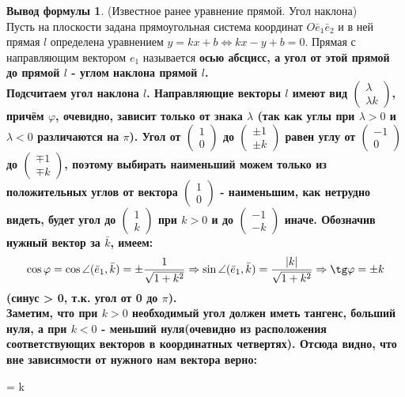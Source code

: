 \documentclass[a4paper, 12pt]{article}
\renewcommand{\phi}{\varphi}
\theoremstyle{definition}
\newtheorem*{formula}{Вывод формулы}
\newenvironment{boxedalign*}
  {\begin{equation*}\begin{lrbox}{\boxedalignbox}$\begin{aligned}}
  {\end{aligned}$\end{lrbox}\fbox{\usebox{\boxedalignbox}}\end{equation*}}
\begin{document}
	\begin{formula}(Известное ранее уравнение прямой. Угол наклона)\\
		Пусть на плоскости задана прямоугольная система координат $O\bar{e}_{1}\bar{e}_{2}$ и в ней прямая $l$ определена уравнением $y = kx + b \Leftrightarrow kx - y + b = 0$. Прямая с направляющим вектором $e_{1}$ называется \bfseries осью абсцисс\mdseries, а угол от этой прямой до прямой $l$ - \bfseries углом наклона \mdseries прямой $l$.\\
		Подсчитаем угол наклона $l$. Направляющие векторы $l$ имеют вид $\begin{pmatrix}\lambda\\ \lambda k\end{pmatrix}$, причём $\phi$, очевидно, зависит только от знака $\lambda$ (так как углы при $\lambda > 0$ и  $\lambda < 0$ различаются на $\pi$). Угол от $\begin{pmatrix} 1\\0 \end{pmatrix}$ до $\begin{pmatrix} \pm 1\\\pm k\end{pmatrix}$ равен углу от $\begin{pmatrix} -1\\0 \end{pmatrix}$ до $\begin{pmatrix} \mp 1\\\mp k\end{pmatrix}$, поэтому выбирать наименьший можем только из положительных углов от вектора $\begin{pmatrix} 1\\0 \end{pmatrix}$ - наименьшим, как нетрудно видеть, будет угол до $\begin{pmatrix} 1\\k \end{pmatrix}$ при $k>0$ и до $\begin{pmatrix} -1 \\ -k \end{pmatrix}$ иначе. Обозначив нужный вектор за $\bar{k}$, имеем: 
		\begin{align*}
			\cos\phi = \cos\angle(\bar{e}_{1}, \bar{k}) = \pm \frac{1}{\sqrt{1 + k^2}} \Rightarrow \sin\angle(\bar{e}_{1}, \bar{k}) = \frac{|k|}{\sqrt{1 + k^2}} \Rightarrow \tg\phi = \pm k 
		\end{align*}
		(синус > 0, т.к. угол от 0 до $\pi$).\\
		Заметим, что при $k > 0$ необходимый угол должен иметь тангенс, больший нуля, а при $k < 0$ - меньший нуля(очевидно из расположения соответствующих векторов в координатных четвертях). Отсюда видно, что вне зависимости от нужного нам вектора верно: \begin{boxedalign*} \tg\phi = k\end{boxedalign*}
	\end{formula}
\end{document}
